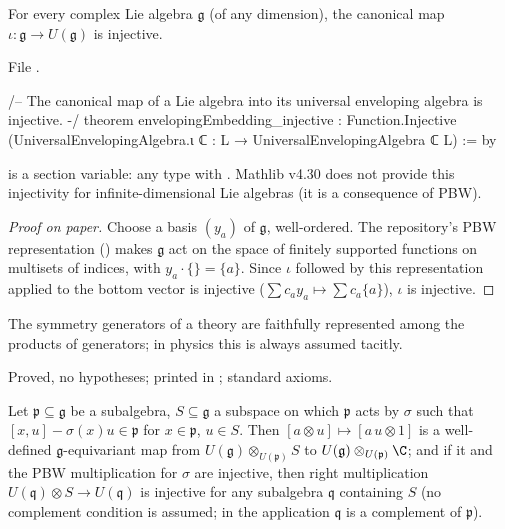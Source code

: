\begin{theorem}\label{ch17:thm:enveloping}
For every complex Lie algebra $\mathfrak g$ (of any dimension), the canonical map $\iota:\mathfrak g\to U(\mathfrak g)$ is injective.
\end{theorem}

\noindent File .
\begin{leancode}
/-- The canonical map of a Lie algebra into its universal enveloping algebra is injective. -/
theorem envelopingEmbedding_injective :
    Function.Injective (UniversalEnvelopingAlgebra.ι ℂ : L → UniversalEnvelopingAlgebra ℂ L) := by
\end{leancode}

\begin{dictionary}
 is a section variable: any type with \chseventeenL{[LieRing L] [LieAlgebra ℂ L]}.  Mathlib v4.30 does not provide this
injectivity for infinite-dimensional Lie algebras (it is a consequence of PBW).
\end{dictionary}

\begin{proof}[Proof on paper]
Choose a basis $(y_a)$ of $\mathfrak g$, well-ordered.  The repository's PBW representation ()
makes $\mathfrak g$ act on the space of finitely supported functions on multisets of indices, with $y_a\cdot\{\}=\{a\}$.  Since
$\iota$ followed by this representation applied to the bottom vector is injective ($\sum c_ay_a\mapsto\sum c_a\{a\}$), $\iota$ is
injective.
\end{proof}

\begin{physics}
The symmetry generators of a theory are faithfully represented among the products of generators; in physics this is
always assumed tacitly.
\end{physics}

\begin{status}
Proved, no hypotheses; printed in ; standard axioms.
\end{status}

\begin{theorem}\label{ch17:thm:inducedvector}
Let $\mathfrak p\subseteq\mathfrak g$ be a subalgebra, $S\subseteq\mathfrak g$ a subspace on which $\mathfrak p$ acts by $\sigma$ such that
$[x,u]-\sigma(x)u\in\mathfrak p$ for $x\in\mathfrak p$, $u\in S$.  Then $[a\otimes u]\mapsto[a\,u\otimes1]$ is a well-defined
$\mathfrak g$-equivariant map from $U(\mathfrak g)\otimes_{U(\mathfrak p)}S$ to $U(\mathfrak g)\otimes_{U(\mathfrak p)}\C$; and if it and the PBW
multiplication for $\sigma$ are injective, then right multiplication $U(\mathfrak q)\otimes S\to U(\mathfrak q)$ is injective for any subalgebra
$\mathfrak q$ containing $S$ (no complement condition is assumed; in the application $\mathfrak q$ is a complement of $\mathfrak p$).
\end{theorem}

